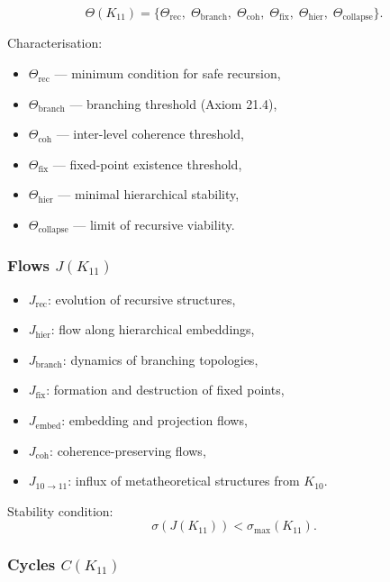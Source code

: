 \[
\Theta(K_{11})=
\{
\Theta_{\mathrm{rec}},\;
\Theta_{\mathrm{branch}},\;
\Theta_{\mathrm{coh}},\;
\Theta_{\mathrm{fix}},\;
\Theta_{\mathrm{hier}},\;
\Theta_{\mathrm{collapse}}
\}.
\]

Characterisation:
\begin{itemize}
    \item $\Theta_{\mathrm{rec}}$ — minimum condition for safe recursion,
    \item $\Theta_{\mathrm{branch}}$ — branching threshold (Axiom 21.4),
    \item $\Theta_{\mathrm{coh}}$ — inter-level coherence threshold,
    \item $\Theta_{\mathrm{fix}}$ — fixed-point existence threshold,
    \item $\Theta_{\mathrm{hier}}$ — minimal hierarchical stability,
    \item $\Theta_{\mathrm{collapse}}$ — limit of recursive viability.
\end{itemize}

\subsubsection{Flows $J(K_{11})$}

\begin{itemize}
    \item $J_{\mathrm{rec}}$: evolution of recursive structures,
    \item $J_{\mathrm{hier}}$: flow along hierarchical embeddings,
    \item $J_{\mathrm{branch}}$: dynamics of branching topologies,
    \item $J_{\mathrm{fix}}$: formation and destruction of fixed points,
    \item $J_{\mathrm{embed}}$: embedding and projection flows,
    \item $J_{\mathrm{coh}}$: coherence-preserving flows,
    \item $J_{10\to11}$: influx of metatheoretical structures from $K_{10}$.
\end{itemize}

Stability condition:
\[
\sigma(J(K_{11})) < \sigma_{\max}(K_{11}).
\]

\subsubsection{Cycles $C(K_{11})$}

